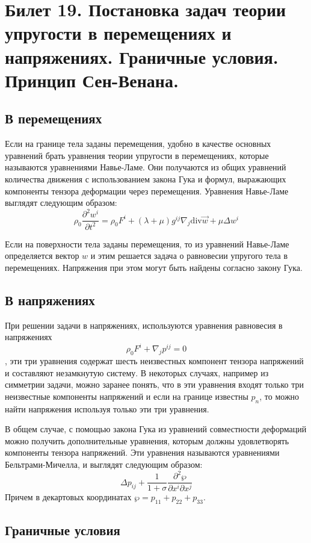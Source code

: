 \newpage
\section{Билет 19. Постановка задач теории упругости в перемещениях и напряжениях. Граничные условия. Принцип Сен-Венана.}

\subsection{В перемещениях}
Если на границе тела заданы перемещения, удобно в качестве основных уравнений брать уравнения теории упругости в перемещениях, которые называются уравнениями Навье-Ламе. Они получаются из общих уравнений количества движения с использованием закона Гука и формул, выражающих компоненты тензора деформации через перемещения. Уравнения Навье-Ламе выглядят следующим образом:
$$
  \rho_0\frac{\partial^2 w^i}{\partial t^2} = \rho_0 F^i + (\lambda + \mu)g^{ij}\nabla_j \mathrm{div} \vec{w} + \mu \Delta w^i
$$

Если на поверхности тела заданы перемещения, то из уравнений Навье-Ламе определяется вектор $w$ и этим решается задача о равновесии упругого тела в перемещениях. Напряжения при этом могут быть найдены согласно закону Гука.

\subsection{В напряжениях}

При решении задачи в напряжениях, используются уравнения равновесия в напряжениях  $$\rho_0 F^i + \nabla_j p^{ij} = 0$$, эти три уравнения содержат шесть неизвестных компонент тензора напряжений и составляют незамкнутую систему. В некоторых случаях, например из симметрии задачи, можно заранее понять, что в эти уравнения входят только три неизвестные компоненты напряжений и если на границе известны $p_n$, то можно найти напряжения используя только эти три уравнения.

В общем случае, с помощью закона Гука из уравнений совместности деформаций можно получить дополнительные уравнения, которым должны удовлетворять компоненты тензора напряжений. Эти уравнения называются уравнениями Бельтрами-Мичелла, и выглядят следующим образом:
$$
  \Delta p_{ij} + \frac{1}{1+\sigma} \frac{\partial^2 \wp}{\partial x^i \partial x^j}
$$
Причем в декартовых координатах $\wp = p_{11} + p_{22} + p_{33}$.

\newpage
\subsection{Граничные условия}

